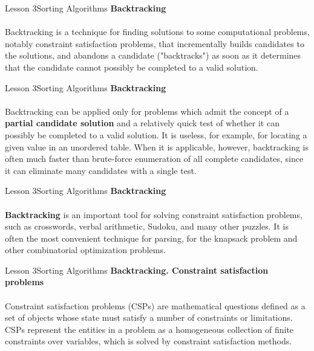 \documentclass[aspectratio=1610]{beamer}
\begin{document}
\begin{frame}{Lesson 3}{Sorting Algorithms}
\LARGE
\textbf{Backtracking}\\~\\
\Large
Backtracking is a technique for finding solutions to some
computational problems, notably constraint satisfaction problems,
that incrementally builds candidates to the solutions, and abandons a
candidate ("backtracks") as soon as it determines that the candidate
cannot possibly be completed to a valid solution.
\end{frame}


\begin{frame}{Lesson 3}{Sorting Algorithms}
\LARGE
\textbf{Backtracking}\\~\\
\Large
Backtracking can be applied only for problems which admit the concept 
of a \textbf{partial candidate solution} and a relatively quick test 
of whether it can possibly be completed to a valid solution. It is 
useless, for example, for locating a given value in an unordered 
table. When it is applicable, however, backtracking is often much 
faster than brute-force enumeration of all complete candidates, since 
it can eliminate many candidates with a single test.
\end{frame}



\begin{frame}{Lesson 3}{Sorting Algorithms}
\LARGE
\textbf{Backtracking}\\~\\
\Large
\textbf{Backtracking} is an important tool for solving \alert{constraint 
satisfaction problems}, such as crosswords, verbal arithmetic, Sudoku,
and many other puzzles. It is often the most convenient technique for
parsing, for the knapsack problem and other combinatorial
optimization problems.
\end{frame}


\begin{frame}{Lesson 3}{Sorting Algorithms}
\LARGE
\textbf{Backtracking. Constraint satisfaction problems}\\~\\
\Large
Constraint satisfaction problems (CSPs) are mathematical questions defined as a set of 
objects whose state must satisfy a number of constraints or limitations. CSPs represent 
the entities in a problem as a homogeneous collection of finite constraints over 
variables, which is solved by constraint satisfaction methods.
\end{frame}
\end{document}
